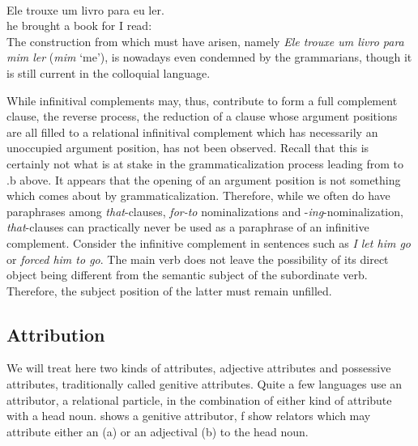 \ea\label{ex:E36}
\langinfo{\LangPort}{}{} \\
\gll Ele  trouxe  um  livro  para  eu  ler.\\
he  brought  a  book  for  I  read:\glinf\\
\z
\noindent The construction from which  must have arisen, namely \textit{Ele trouxe um livro para mim ler} (\textit{mim} ‘me’), is nowadays even condemned by the grammarians, though it is still current in the colloquial language.

\label{page73}While infinitival complements may, thus, contribute to form a full complement clause, the reverse process, the reduction of a clause whose argument positions are all filled to a relational infinitival complement which has necessarily an unoccupied argument position, has not been observed. Recall that this is certainly not what is at stake in the grammaticalization process leading from  to .b above. It appears that the opening of an argument position is not something which comes about by grammaticalization. Therefore, while we often do have paraphrases among \textit{that}{}-clauses, \textit{for-to} nominalizations and -\textit{ing}{}-nominalization, \textit{that}{}-clauses can practically never be used as a paraphrase of an infinitive complement. Consider the infinitive complement in sentences such as \textit{I let him go} or \textit{forced him to go}. The main verb does not leave the possibility of its direct object being different from the semantic subject of the subordinate verb. Therefore, the subject position of the latter must remain unfilled.

\subsection{Attribution} \label{sec:3.3.3}

We will treat here two kinds of attributes, adjective attributes and possessive attributes, traditionally called genitive attributes. Quite a few languages use an attributor, a relational particle, in the combination of either kind of attribute with a head noun.  shows a genitive attributor, f show relators which may attribute either an \np (a) or an adjectival (b) to the head noun.

